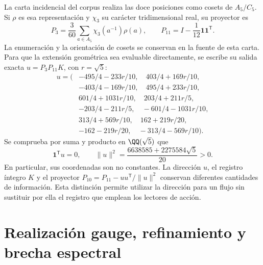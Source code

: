 \documentclass[a4paper,10pt]{article}
\theoremstyle{definition}\newtheorem{definition}[theorem]{Definición}
\theoremstyle{remark}\newtheorem{remark}[theorem]{Observación}
\numberwithin{equation}{section}
\begin{document}
La carta incidencial del corpus realiza las doce posiciones como cosets
de \(A_5/C_5\). Si \(\rho\) es esa representación y \(\chi_3\) su
carácter tridimensional real, su proyector es
\[
 P_3=\frac3{60}\sum_{a\in A_5}\chi_3(a^{-1})\rho(a),\qquad
 P_{11}=I-\frac1{12}\mathbf1\mathbf1^{\mathsf T}.
\]
La enumeración y la orientación de cosets se conservan en la fuente de
esta carta. Para que la extensión geométrica sea evaluable directamente,
se escribe su salida exacta \(u=P_3P_{11}K\), con \(r=\sqrt5\):
\begin{equation}
\begin{split}
u=\bigl(&-495/4-233r/10,\quad403/4+169r/10,\\
&-403/4-169r/10,\quad495/4+233r/10,\\
&601/4+1031r/10,\quad203/4+211r/5,\\
&-203/4-211r/5,\quad-601/4-1031r/10,\\
&313/4+569r/10,\quad162+219r/20,\\
&-162-219r/20,\quad-313/4-569r/10\bigr).
\end{split}
\label{eq:u-main}
\end{equation}
Se comprueba por suma y producto en \(\QQ(\sqrt5)\) que
\[
 \mathbf1^{\mathsf T}u=0,\qquad
 \|u\|^2=\frac{6638585+2275584\sqrt5}{20}>0.
\]
En particular, sus coordenadas son no constantes. La dirección \(u\),
el registro íntegro \(K\) y el proyector
\(P_{10}=P_{11}-uu^{\mathsf T}/\|u\|^2\) conservan diferentes cantidades
de información. Esta distinción permite utilizar la dirección para un
flujo sin sustituir por ella el registro que emplean los lectores de acción.


















\clearpage
\part{Realización gauge, refinamiento y brecha espectral}






\end{document}

